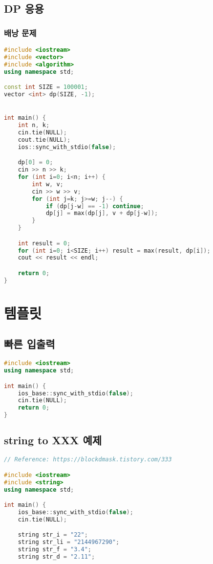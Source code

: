 \documentclass[]{article}
\begin{document}
\begin{multicols*}{2}
\subsection{DP 응용}
\subsubsection{배낭 문제}
\begin{lstlisting}[language=c++]
#include <iostream>
#include <vector>
#include <algorithm>
using namespace std;

const int SIZE = 100001;
vector <int> dp(SIZE, -1);


int main() {
    int n, k;
    cin.tie(NULL);
    cout.tie(NULL);
    ios::sync_with_stdio(false);

    dp[0] = 0;
    cin >> n >> k;
    for (int i=0; i<n; i++) {
        int w, v;
        cin >> w >> v;
        for (int j=k; j>=w; j--) {
            if (dp[j-w] == -1) continue;
            dp[j] = max(dp[j], v + dp[j-w]);
        }
    }

    int result = 0;
    for (int i=0; i<SIZE; i++) result = max(result, dp[i]);
    cout << result << endl;

    return 0;
}
\end{lstlisting}
\columnbreak
\section{템플릿}
\subsection{빠른 입출력}
\begin{lstlisting}[language=c++]
#include <iostream>
using namespace std;

int main() {
    ios_base::sync_with_stdio(false);
    cin.tie(NULL);
    return 0;
}
\end{lstlisting}
\subsection{string to XXX 예제}
\begin{lstlisting}[language=c++]
// Reference: https://blockdmask.tistory.com/333

#include <iostream>
#include <string>
using namespace std;

int main() {
    ios_base::sync_with_stdio(false);
    cin.tie(NULL);

    string str_i = "22";
    string str_li = "2144967290";
    string str_f = "3.4";
    string str_d = "2.11";
 

\end{lstlisting}
\end{multicols*}
\end{document}
